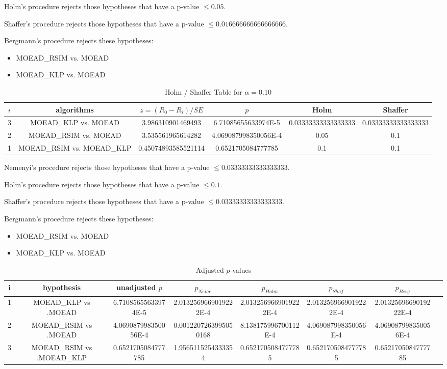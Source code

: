\documentclass[a4paper,10pt]{article}
\begin{document}
\begin{landscape}
Holm's procedure rejects those hypotheses that have a p-value $\le0.05$.


Shaffer's procedure rejects those hypotheses that have a p-value $\le0.016666666666666666$.


Bergmann's procedure rejects these hypotheses:


\begin{itemize}


\item MOEAD_RSIM vs. MOEAD
\item MOEAD_KLP vs. MOEAD
\end{itemize}


\begin{table}[!htp]
\centering\tiny
\caption{Holm / Shaffer Table for $\alpha=0.10$}
\begin{tabular}{cccccc}
$i$&algorithms&$z=(R_0 - R_i)/SE$&$p$&Holm&Shaffer\\
\hline
3&MOEAD_KLP vs. MOEAD&3.986310901469493&6.71085655633974E-5&0.03333333333333333&0.03333333333333333\\
2&MOEAD_RSIM vs. MOEAD&3.535561965614282&4.069087998350056E-4&0.05&0.1\\
1&MOEAD_RSIM vs. MOEAD_KLP&0.45074893585521114&0.6521705084777785&0.1&0.1\\
\hline
\end{tabular}
\end{table}
Nemenyi's procedure rejects those hypotheses that have a p-value $\le0.03333333333333333$.


Holm's procedure rejects those hypotheses that have a p-value $\le0.1$.


Shaffer's procedure rejects those hypotheses that have a p-value $\le0.03333333333333333$.


Bergmann's procedure rejects these hypotheses:


\begin{itemize}


\item MOEAD_RSIM vs. MOEAD
\item MOEAD_KLP vs. MOEAD
\end{itemize}


\begin{table}[!htp]
\centering\tiny
\caption{Adjusted $p$-values}
\begin{tabular}{cccccccc}
i&hypothesis&unadjusted $p$&$p_{Neme}$&$p_{Holm}$&$p_{Shaf}$&$p_{Berg}$\\
\hline
1&MOEAD_KLP vs .MOEAD&6.71085655633974E-5&2.0132569669019222E-4&2.0132569669019222E-4&2.0132569669019222E-4&2.0132569669019222E-4\\
2&MOEAD_RSIM vs .MOEAD&4.069087998350056E-4&0.0012207263995050168&8.138175996700112E-4&4.069087998350056E-4&4.069087998350056E-4\\
3&MOEAD_RSIM vs .MOEAD_KLP&0.6521705084777785&1.9565115254333354&0.6521705084777785&0.6521705084777785&0.6521705084777785\\
\hline
\end{tabular}
\end{table}

\end{landscape}
\end{document}
